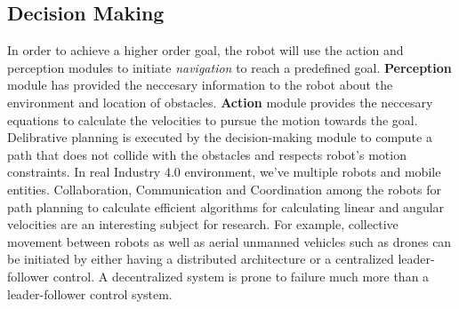 \subsection{Decision Making}
In order to achieve a higher order goal, the robot will use the action and perception modules to initiate \textit{navigation} to reach a predefined goal. 
\textbf{Perception} module has provided the neccesary information to the robot about the environment and location of obstacles. \textbf{Action} module provides 
the neccesary equations to calculate the velocities to pursue the motion towards the goal. Delibrative planning is executed by the decision-making module to compute a 
path that does not collide with the obstacles and respects robot's motion constraints. In real Industry 4.0 environment, we've multiple robots and mobile entities. Collaboration, Communication
and Coordination among the robots for path planning to calculate efficient algorithms for calculating linear and angular velocities are an interesting subject for research.
For example, collective movement between robots as well as aerial unmanned vehicles such as drones can be initiated by either having a distributed architecture or a centralized leader-follower control.
A decentralized system is prone to failure much more than a leader-follower control system.
